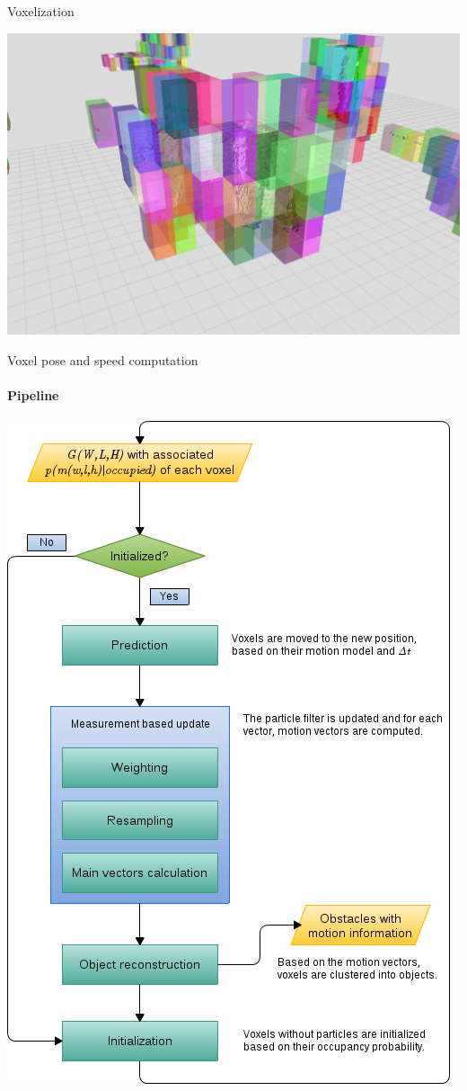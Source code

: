 \begin{frame}{Voxelization}
  \begin{center}
    \includegraphics[height=0.7\textheight]{voxelization}
  \end{center}
\end{frame}

\begin{frame}[plain]{Voxel pose and speed computation}
  \framesubtitle{Pipeline}
  \begin{center}
    \includegraphics[height=1.1\textheight]{voxelPoseAndSpeedComputation}
  \end{center}
\end{frame}


